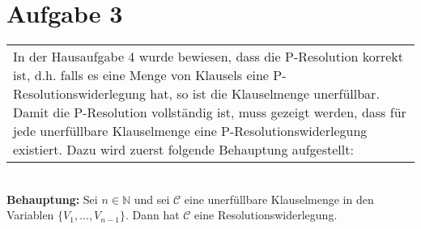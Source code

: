 \documentclass[a4paper,10pt]{article}
\newcommand{\tabspace}{15cm}
\begin{document}
\section*{Aufgabe 3}
\begin{tabular}{@{} p{\tabspace}}
In der Hausaufgabe 4 wurde bewiesen, dass die P-Resolution korrekt ist, d.h. falls es eine Menge von Klausels eine P-Resolutionswiderlegung hat, so ist die Klauselmenge unerfüllbar. Damit die P-Resolution vollständig ist, muss gezeigt werden, dass für jede unerfüllbare Klauselmenge eine P-Resolutionswiderlegung existiert. Dazu wird zuerst folgende Behauptung aufgestellt: \\
\end{tabular}
\ \\
\textbf{Behauptung: } Sei $n \in \mathbb{N}$ und sei $\mathcal{C}$ eine unerfüllbare Klauselmenge in den Variablen $\{V_1,...,V_{n-1} \}$. Dann hat $\mathcal{C}$ eine Resolutionswiderlegung. 
\end{document}
